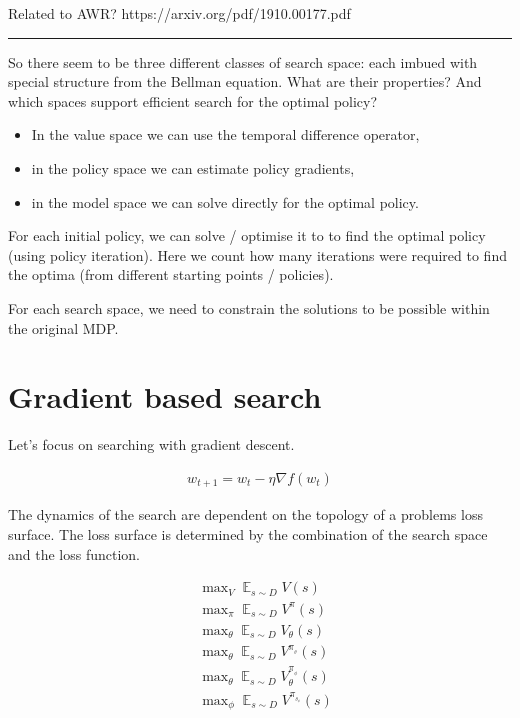 Related to AWR? https://arxiv.org/pdf/1910.00177.pdf

\begin{center}\rule{0.5\linewidth}{\linethickness}\end{center}

\begin{displayquote}
So there seem to be three different classes of search space: each imbued with special
structure from the Bellman equation. What are their properties? And which spaces
support efficient search for the optimal policy?
\end{displayquote}

\begin{itemize}
\tightlist
\item
  In the value space we can use the temporal difference operator,
\item
  in the policy space we can estimate policy gradients,
\item
  in the model space we can solve directly for the optimal policy.
\end{itemize}

For each initial policy, we can solve / optimise it to to find the
optimal policy (using policy iteration). Here we count how many
iterations were required to find the optima (from different starting
points / policies).

For each search space, we need to constrain the solutions to be possible within the original MDP.

\section{Gradient based search}

Let's focus on searching with gradient descent.

\begin{align}
w_{t+1} = w_t - \eta \nabla f(w_t)
\end{align}

The dynamics of the search are dependent on the topology of a problems loss surface.
The loss surface is determined by the combination of the search space and the loss function.

\begin{align}
&\mathop{\text{max}}_V \mathop{\mathbb E}_{s\sim D} V(s) \\
&\mathop{\text{max}}_{\pi} \mathop{\mathbb E}_{s\sim D}V^{\pi}(s) \\
&\mathop{\text{max}}_{\theta} \mathop{\mathbb E}_{s\sim D} V_{\theta}(s)\label{eq:deepQ}\\
&\mathop{\text{max}}_{\theta} \mathop{\mathbb E}_{s\sim D} V^{\pi_{_{\theta}}}(s) \\
&\mathop{\text{max}}_{\theta} \mathop{\mathbb E}_{s\sim D} V_{\theta}^{\pi_{_{\phi}}}(s)\label{eq:actorcritic} \\
&\mathop{\text{max}}_{\phi} \mathop{\mathbb E}_{s\sim D} V^{\pi_{_{\theta_{\phi}}}}(s)
\end{align}

